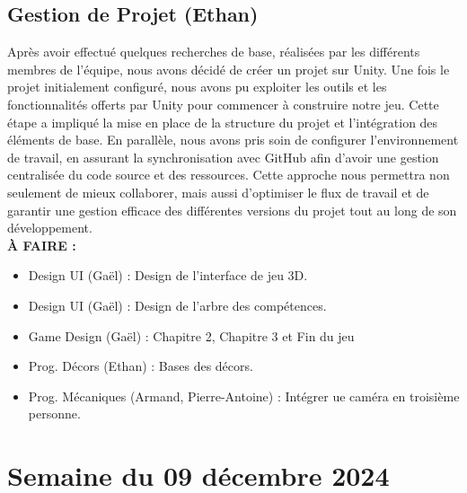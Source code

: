 \documentclass{report}
\begin{document}
\subsection*{Gestion de Projet (Ethan)}
Après avoir effectué quelques recherches de base, réalisées par les différents membres de l'équipe, nous avons décidé de créer un projet sur Unity. Une fois le projet initialement configuré, nous avons pu exploiter les outils et les fonctionnalités offerts par Unity pour commencer à construire notre jeu. Cette étape a impliqué la mise en place de la structure du projet et l'intégration des éléments de base. En parallèle, nous avons pris soin de configurer l'environnement de travail, en assurant la synchronisation avec GitHub afin d'avoir une gestion centralisée du code source et des ressources. Cette approche nous permettra non seulement de mieux collaborer, mais aussi d'optimiser le flux de travail et de garantir une gestion efficace des différentes versions du projet tout au long de son développement.
\\[1cm]
\textbf{À FAIRE :}
\begin{itemize}
    \item Design UI (Gaël) : Design de l'interface de jeu 3D.
    \item Design UI (Gaël) : Design de l'arbre des compétences.
    \item Game Design (Gaël) : Chapitre 2, Chapitre 3 et Fin du jeu
    \item Prog. Décors (Ethan) : Bases des décors.
    \item Prog. Mécaniques (Armand, Pierre-Antoine) : Intégrer ue caméra en troisième personne.
\end{itemize}







\newpage
\section{Semaine du 09 décembre 2024}
\end{document}
